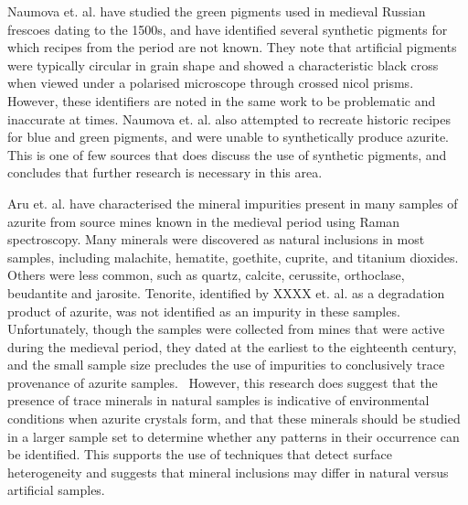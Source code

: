 Naumova et. al. have studied the green pigments used in medieval Russian frescoes dating to the 1500s, and have identified several synthetic pigments for which recipes from the period are not known. They note that artificial pigments were typically circular in grain shape and showed a characteristic black cross when viewed under a polarised microscope through crossed nicol prisms. However, these identifiers are noted in the same work to be problematic and inaccurate at times. Naumova et. al. also attempted to recreate historic recipes for blue and green pigments, and were unable to synthetically produce azurite. This is one of few sources that does discuss the use of synthetic pigments, and concludes that further research is necessary in this area.~\autocite{Naumova1994,Naumova1990}

Aru et. al. have characterised the mineral impurities present in many samples of azurite from source mines known in the medieval period using Raman spectroscopy. Many minerals were discovered as natural inclusions in most samples, including malachite, hematite, goethite, cuprite, and titanium dioxides. Others were less common, such as quartz, calcite, cerussite, orthoclase, beudantite and jarosite. Tenorite, identified by XXXX et. al. as a degradation product of azurite, was not identified as an impurity in these samples. Unfortunately, though the samples were collected from mines that were active during the medieval period, they dated at the earliest to the eighteenth century, and the small sample size precludes the use of impurities to conclusively trace provenance of azurite samples.~\autocite{Aru} However, this research does suggest that the presence of trace minerals in natural samples is indicative of environmental conditions when azurite crystals form, and that these minerals should be studied in a larger sample set to determine whether any patterns in their occurrence can be identified. This supports the use of techniques that detect surface heterogeneity and suggests that mineral inclusions may differ in natural versus artificial samples.



